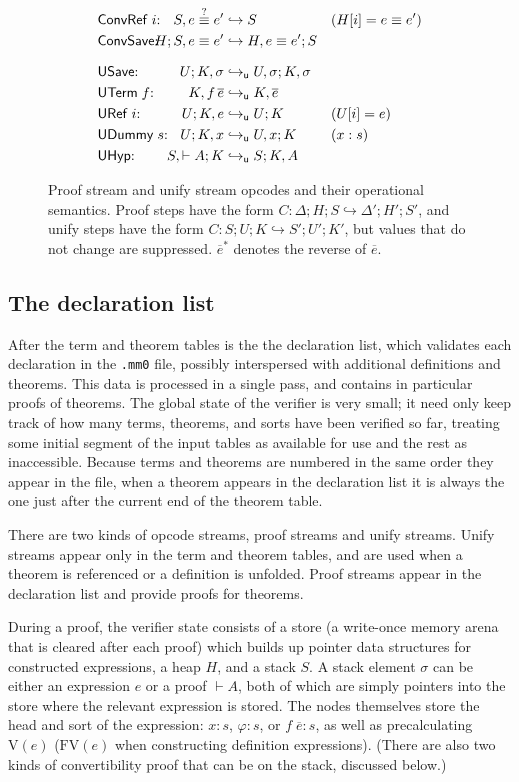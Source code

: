 \documentclass[runningheads]{llncs}
\newcommand{\hto}{\hookrightarrow}
\newcommand{\uto}{\hookrightarrow_{\mathsf{u}}}
\newcommand{\coconv}{\mathrel{\smash{\overset{?}{\equiv}}}}
\begin{document}
\begin{figure}
\begin{align*}
    &\rlap{$\mathsf{ConvRef}\;i{:}$}&S,e\coconv e'&\hto S&&(H[i]=e\equiv e')\\
    &\rlap{$\mathsf{ConvSave}{:}$}&H;S,e\equiv e'&\hto H,e\equiv e';S\\[7pt]
    &\mathsf{USave}{:}&U;K,\sigma&\uto U,\sigma;K,\sigma\\
    &\rlap{$\mathsf{UTerm}\;f{:}$}&K,f\,\overline{e}&\uto K,\overline{e}\\
    &\mathsf{URef}\;i{:}&U;K,e&\uto U;K&&(U[i]=e)\\
    &\rlap{$\mathsf{UDummy}\;s{:}$}&U;K,x&\uto U,x;K&&(x:s)\\
    &\mathsf{UHyp}{:}&S,{\vdash A};K&\uto S;K,A
  \end{align*}
  \caption{Proof stream and unify stream opcodes and their operational semantics. Proof steps have the form $C:\Delta;H;S\hto\Delta';H';S'$, and unify steps have the form $C:S;U;K\hto S';U';K'$, but values that do not change are suppressed. $\overline{e}^*$ denotes the reverse of $\overline{e}$.}
  \label{fig:stream}
\end{figure}

\subsection{The declaration list}\label{sec:stream}
After the term and theorem tables is the the declaration list, which validates each declaration in the \texttt{.mm0} file, possibly interspersed with additional definitions and theorems. This data is processed in a single pass, and contains in particular proofs of theorems. The global state of the verifier is very small; it need only keep track of how many terms, theorems, and sorts have been verified so far, treating some initial segment of the input tables as available for use and the rest as inaccessible. Because terms and theorems are numbered in the same order they appear in the file, when a theorem appears in the declaration list it is always the one just after the current end of the theorem table.

There are two kinds of opcode streams, proof streams and unify streams. Unify streams appear only in the term and theorem tables, and are used when a theorem is referenced or a definition is unfolded. Proof streams appear in the declaration list and provide proofs for theorems.

During a proof, the verifier state consists of a store (a write-once memory arena that is cleared after each proof) which builds up pointer data structures for constructed expressions, a heap $H$, and a stack $S$. A stack element $\sigma$ can be either an expression $e$ or a proof $\vdash A$, both of which are simply pointers into the store where the relevant expression is stored. The nodes themselves store the head and sort of the expression: $x:s$, $\varphi:s$, or $f\;\overline{e}:s$, as well as precalculating $\mathrm{V}(e)$ ($\mathrm{FV}(e)$ when constructing definition expressions). (There are also two kinds of convertibility proof that can be on the stack, discussed below.)
\end{document}
